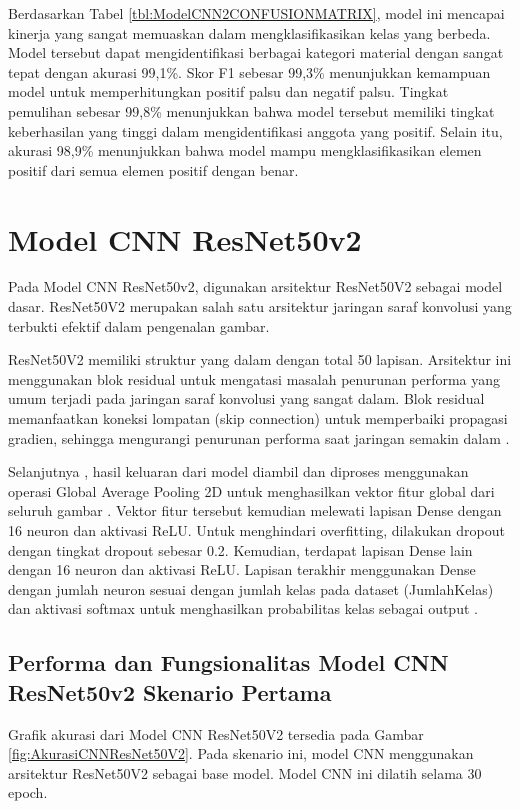 Berdasarkan Tabel \ref{tbl:ModelCNN2CONFUSIONMATRIX}, model ini mencapai kinerja yang sangat memuaskan dalam mengklasifikasikan kelas yang berbeda. Model tersebut dapat mengidentifikasi berbagai kategori material dengan sangat tepat dengan akurasi 99,1\%. Skor F1 sebesar 99,3\% menunjukkan kemampuan model untuk memperhitungkan positif palsu dan negatif palsu. Tingkat pemulihan sebesar 99,8\% menunjukkan bahwa model tersebut memiliki tingkat keberhasilan yang tinggi dalam mengidentifikasi anggota yang positif. Selain itu, akurasi 98,9\% menunjukkan bahwa model mampu mengklasifikasikan elemen positif dari semua elemen positif dengan benar. 


\section{Model CNN ResNet50v2}
Pada Model CNN ResNet50v2, digunakan arsitektur ResNet50V2 sebagai model dasar. ResNet50V2 merupakan salah satu arsitektur jaringan saraf konvolusi yang terbukti efektif dalam pengenalan gambar.

ResNet50V2 memiliki struktur yang dalam dengan total 50 lapisan. Arsitektur ini menggunakan blok residual untuk mengatasi masalah penurunan performa yang umum terjadi pada jaringan saraf konvolusi yang sangat dalam. Blok residual memanfaatkan koneksi lompatan (skip connection) untuk memperbaiki propagasi gradien, sehingga mengurangi penurunan performa saat jaringan semakin dalam . 

Selanjutnya , hasil keluaran dari model diambil dan diproses menggunakan operasi Global Average Pooling 2D untuk menghasilkan vektor fitur global dari seluruh gambar . Vektor fitur tersebut kemudian melewati lapisan Dense dengan 16 neuron dan aktivasi ReLU. Untuk menghindari overfitting, dilakukan dropout dengan tingkat dropout sebesar 0.2. Kemudian, terdapat lapisan Dense lain dengan 16 neuron dan aktivasi ReLU. Lapisan terakhir menggunakan Dense dengan jumlah neuron sesuai dengan jumlah kelas pada dataset (JumlahKelas) dan aktivasi softmax untuk menghasilkan probabilitas kelas sebagai output . 

\subsection*{Performa dan Fungsionalitas Model CNN ResNet50v2 Skenario Pertama}

Grafik akurasi dari Model CNN ResNet50V2 tersedia pada Gambar \ref{fig:AkurasiCNNResNet50V2}. Pada skenario ini, model CNN menggunakan arsitektur ResNet50V2 sebagai base model. Model CNN ini dilatih selama 30 epoch.


